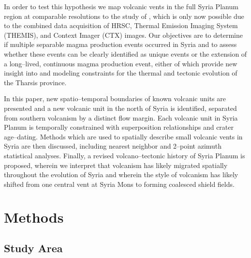 In order to test this hypothesis we map volcanic vents in the full Syria Planum region at comparable resolutions to the study of \citet{Baptista2008}, which is only now possible due to the combined data acquisition of HRSC, Thermal Emission Imaging System (THEMIS), and Context Imager (CTX) images. Our objectives are to determine if multiple separable magma production events occurred in Syria and to assess whether these events can be clearly identified as unique events or the extension of a long--lived, continuous magma production event, either of which provide new insight into and modeling constraints for the thermal and tectonic evolution of the Tharsis province.

In this paper, new spatio--temporal boundaries of known volcanic units are presented and a new volcanic unit in the north of Syria is identified, separated from southern volcanism by a distinct flow margin. Each volcanic unit in Syria Planum is temporally constrained with superposition relationships and crater age--dating. Methods which are used to spatially describe small volcanic vents in Syria are then discussed, including nearest neighbor and 2--point azimuth statistical analyses. Finally, a revised volcano--tectonic history of Syria Planum is proposed, wherein we interpret that volcanism has likely migrated spatially throughout the evolution of Syria and wherein the style of volcanism has likely shifted from one central vent at Syria Mons to forming coalesced shield fields.

\section{Methods}

\subsection{Study Area}

